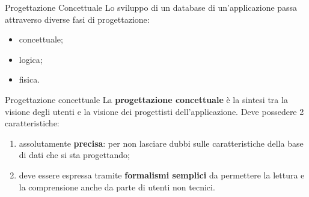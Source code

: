 \begin{frame}{Progettazione Concettuale}
\vspace{.5cm}
Lo sviluppo di un database di un'applicazione passa attraverso diverse fasi di progettazione:
\begin{itemize}[<+->]
    \item concettuale;
    \item logica;
    \item fisica.
\end{itemize}
\pause
\begin{block}{Progettazione concettuale}
    La \textbf{progettazione concettuale} \`e la sintesi tra la visione degli utenti e la visione dei progettisti dell'applicazione.
\pause
Deve possedere 2 caratteristiche:
    \begin{enumerate}[<+->]
        \item assolutamente \textbf{precisa}: per non lasciare dubbi sulle caratteristiche della base di dati che si sta progettando;
        \item deve essere espressa tramite \textbf{formalismi semplici} da permettere la lettura e la comprensione anche da parte di utenti non tecnici.
    \end{enumerate}
\end{block}
\end{frame}
%
